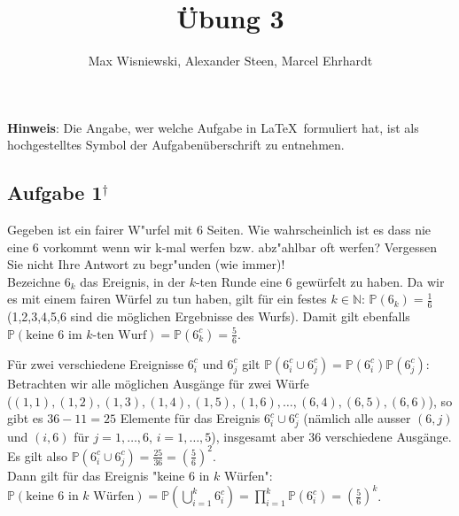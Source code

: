 \documentclass[11pt,a4paper,ngerman]{article}
\date{}
\title{Übung 3}
\author{Max Wisniewski\maxw, Alexander Steen\alex, Marcel Ehrhardt\marcel}
\newcommand{\Prob}{\mathbb{P}}
\newcommand{\alex}{$^\dagger$}
\begin{document}

\renewcommand{\figurename}{Figure}

\maketitle
\thispagestyle{fancy}

\begin{center}
\textbf{Hinweis}: Die Angabe, wer welche Aufgabe in \LaTeX\ formuliert hat, ist als hochgestelltes Symbol der Aufgabenüberschrift zu entnehmen.
\end{center}


\subsection*{Aufgabe 1\alex}
Gegeben ist ein fairer W"urfel mit 6 Seiten. Wie wahrscheinlich ist es dass nie eine
6 vorkommt wenn wir k-mal werfen bzw. abz"ahlbar oft werfen? Vergessen Sie nicht
Ihre Antwort zu begr"unden (wie immer)!  \\

Bezeichne $6_k$ das Ereignis, in der $k$-ten Runde eine 6 gewürfelt zu haben.
Da wir es mit einem fairen Würfel zu tun haben, gilt für ein festes $k \in \mathbb{N}$:
$\Prob(6_k) = \frac{1}{6}$ (1,2,3,4,5,6 sind die möglichen Ergebnisse des Wurfs).
Damit gilt ebenfalls $\Prob(\text{keine 6 im $k$-ten Wurf}) = \Prob(6_k^c) = \frac{5}{6}$.

Für zwei verschiedene Ereignisse $6_i^c$ und $6_j^c$ gilt $\Prob(6_i^c \cup 6_j^c) = \Prob(6_i^c) \Prob(6_j^c)$: \\
Betrachten wir alle möglichen Ausgänge für zwei Würfe \\
($(1,1), (1,2), (1,3), (1,4), (1,5), (1,6), \ldots, (6,4), (6,5), (6,6)$), so gibt es $36 - 11 = 25$ Elemente für das Ereignis $6_i^c \cup 6_j^c$ (nämlich alle ausser $(6,j)$ und $(i,6)$ für $j = 1,\ldots,6$, $i = 1,\ldots,5$), insgesamt aber $36$ verschiedene Ausgänge.
Es gilt also $\Prob(6_i^c \cup 6_j^c) = \frac{25}{36} = \left(\frac{5}{6}\right)^2$. \\

Dann gilt für das Ereignis "keine 6 in $k$ Würfen":\\
$\Prob(\text{keine 6 in $k$ Würfen}) = \Prob(\bigcup_{i=1}^k 6_i^c)
= \prod_{i=1}^k \Prob(6_i^c) = \left(\frac{5}{6}\right)^k$.
\end{document}
